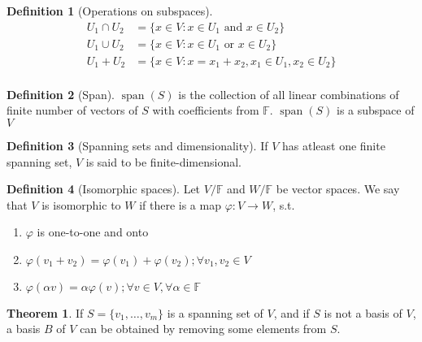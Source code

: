 \documentclass[fleqn, a5paper, 10pt]{amsart}
\DeclareMathOperator{\vspan}{\mathrm{span}} %
\theoremstyle{definition}
\newtheorem{definition}{Definition} %
\theoremstyle{theorem}
\newtheorem{theorem}{Theorem} %
\theoremstyle{remark}
\numberwithin{corollary}{theorem}
\numberwithin{equation}{theorem}
\begin{document}
\begin{definition}[Operations on subspaces]
	\begin{align*}
		U_1 \cap U_2 &= \{x \in V : x \in U_1 \text{ and } x \in U_2\}\\
		U_1 \cup U_2 &= \{x \in V : x \in U_1 \text{ or } x \in U_2\}\\
		U_1 + U_2 &= \{x \in V : x = x_1 + x_2, x_1 \in U_1, x_2 \in U_2\}\\
	\end{align*}
\end{definition}

\begin{definition}[Span]
	$\vspan(S)$ is the collection of all linear combinations of finite number of vectors of $S$ with coefficients from $\mathbb{F}$. $\vspan(S)$ is a subspace of $V$ 
\end{definition}

\begin{definition}[Spanning sets and dimensionality]
	If $V$ has atleast one finite spanning set, $V$ is said to be finite-dimensional.
\end{definition}

\begin{definition}[Isomorphic spaces]
	Let $V/\mathbb{F}$ and $W/\mathbb{F}$ be vector spaces. We say that $V$ is isomorphic to $W$ if there is a map $\varphi : V \to W$, s.t.
	\begin{enumerate}
		\item $\varphi$ is one-to-one and onto
		\item $\varphi(v_1 + v_2) = \varphi(v_1) + \varphi(v_2) ; \forall v_1, v_2 \in V$
		\item $\varphi(\alpha v) = \alpha \varphi(v) ; \forall v \in V, \forall \alpha \in \mathbb{F}$
	\end{enumerate}
\end{definition}

\begin{theorem}
	If $S = \{v_1, \dots, v_m\}$ is a spanning set of $V$, and if $S$ is not a basis of $V$, a basis $B$ of $V$ can be obtained by removing some elements from $S$.
\end{theorem}
\end{document}
